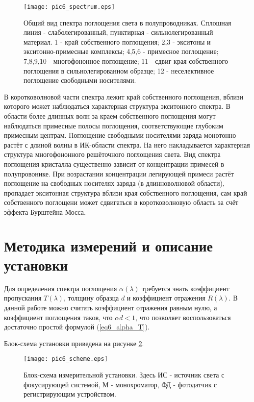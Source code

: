 \begin{figure}[h!]\centering
\texttt{[image: pic6\_spectrum.eps]}
\caption{Общий вид спектра поглощения света в полупроводниках. Сплошная линия - слаболегированный, пунктирная - сильнолегированный материал. 1 - край собственного поглощения; 2,3 - экситоны и экситонно-примесные комплексы; 4,5,6 - примесное поглощение; 7,8,9,10 - многофононное поглощение; 11 - сдвиг края собственного поглощения в сильнолегированном образце; 12 - неселективное поглощение свободными носителями.}
\label{pic6_spectrum}
\end{figure}

В коротковолновой части спектра лежит край собственного поглощения, вблизи которого может наблюдаться характерная структура экситонного спектра. В области более длинных волн за краем собственного поглощения могут наблюдаться примесные полосы поглощения, соответствующие глубоким примесным центрам. Поглощение свободными носителями заряда монотонно растёт с длиной волны в ИК-области спектра. На него накладывается характерная структура многофононного решёточного поглощения света. Вид спектра поглощения кристалла существенно зависит от концентрации примесей в полупровонике. При возрастании концентрации легирующей примеси растёт поглощение на свободных носителях заряда (в длинноволновой области), пропадает экситонная структура вблизи края собственного поглощения, сам край собственного поглощени может сдвигаться в коротковолновую область за счёт эффекта Бурштейна-Мосса.

\section{Методика измерений и описание установки}
Для определения спектра поглощения $\alpha(\lambda)$ требуется знать коэффициент пропускания $T(\lambda)$, толщину образца $d$ и коэффициент отражения $R(\lambda)$. В данной работе можно считать коэффициент отражения равным нулю, а коэффициент поглощения таков, что $\alpha d < 1$, что позволяет воспользоваться достаточно простой формулой (\ref{eq6_alpha_T}).

Блок-схема установки приведена на рисунке \ref{pic6_scheme}.

\begin{figure}[h!]\centering
\texttt{[image: pic6\_scheme.eps]}
\caption{Блок-схема измерительной установки. Здесь ИС - источник света с фокусирующей системой, М - монохроматор, ФД - фотодатчик с регистрирующим устройством.}
\label{pic6_scheme}
\end{figure}

